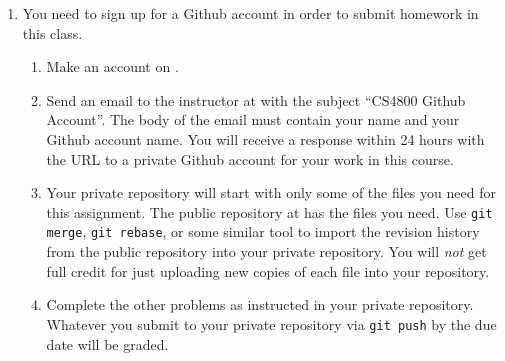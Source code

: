 \documentclass{article}
\begin{document}
\begin{enumerate}

\pagebreak[1]
\item
  You need to sign up for a Github account in order to submit homework in this
  class.
  \begin{enumerate}
  \item
    Make an account on .
  \item
    Send an email to the instructor at  with the subject
    ``CS4800 Github Account''.  The body of the email must contain your name and
    your Github account name.  You will receive a response within 24 hours with
    the URL to a private Github account for your work in this course.
  \item
    Your private repository will start with only some of the files you need for
    this assignment.  The public repository at
     has the files you need.  Use
    \texttt{git merge}, \texttt{git rebase}, or some similar tool to import the
    revision history from the public repository into your private repository.
    You will \emph{not} get full credit for just uploading new copies of each
    file into your repository.
  \item
    Complete the other problems as instructed in your private repository.
    Whatever you submit to your private repository via \texttt{git push} by the
    due date will be graded.
  \end{enumerate}


\end{enumerate}
\end{document}
